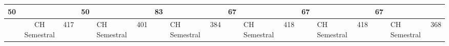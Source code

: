 \begin{landscape}
\begin{table}[h!]
\begin{tabular}{lcllcllcllcllcllcl}
\multicolumn{1}{|l|}{50}  & \multicolumn{1}{c|}{}                                                                                                   & \multicolumn{1}{l|}{}        & \multicolumn{1}{l|}{50} & \multicolumn{1}{c|}{}                                                                                                      & \multicolumn{1}{l|}{}         & \multicolumn{1}{l|}{83} & \multicolumn{1}{c|}{}                                                                                                   & \multicolumn{1}{l|}{}         & \multicolumn{1}{l|}{67} & \multicolumn{1}{c|}{}                                                                                            & \multicolumn{1}{l|}{}         & \multicolumn{1}{l|}{67} & \multicolumn{1}{c|}{}                                                                                                              & \multicolumn{1}{l|}{}         & \multicolumn{1}{l|}{67} & \multicolumn{1}{c|}{}                                                                                                        & \multicolumn{1}{l|}{}         \\ \hline
                          & CH Semestral                                                                                                            & 417                          &                         & \multicolumn{1}{l}{CH Semestral}                                                                                           & 401                           &                         & \multicolumn{1}{l}{CH Semestral}                                                                                        & 384                           &                         & \multicolumn{1}{l}{CH Semestral}                                                                                 & 418                           &                         & \multicolumn{1}{l}{CH Semestral}                                                                                                   & 418                           &                         & \multicolumn{1}{l}{CH Semestral}                                                                                             & 368                           \\

\end{tabular}
\end{table}
\end{landscape}
